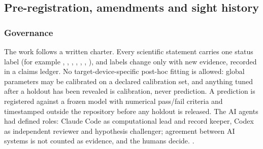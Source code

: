 \subsection{Pre-registration, amendments and sight history}
\label{sec:m-reg}

\subsubsection{Governance}
\label{sec:m-reg-governance}

The work follows a written charter. Every scientific statement carries one status label (for example
, , , , , ,
), and labels change only with new evidence, recorded in a claims ledger. %
No target-device-specific post-hoc fitting is allowed: global parameters may be calibrated on a declared calibration
set, and anything tuned after a holdout has been revealed is calibration, never prediction. %
A prediction is registered against a frozen model with numerical pass/fail criteria and timestamped outside the
repository before any holdout is released. %
The AI agents had defined roles: Claude Code as computational lead and record keeper, Codex as independent reviewer
and hypothesis challenger; agreement between AI systems is not counted as evidence, and the humans decide. %
. %

